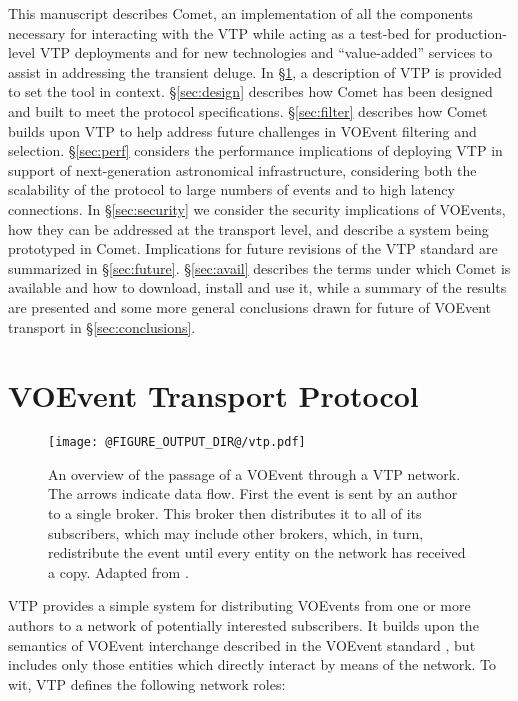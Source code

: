 \documentclass[5p,authoryear]{elsarticle}
\begin{document}
This manuscript describes Comet, an implementation of all the components
necessary for interacting with the VTP while acting as a test-bed for
production-level VTP deployments and for new technologies and ``value-added''
services to assist in addressing the transient deluge. In \S\ref{sec:vtp}, a
description of VTP is provided to set the tool in context.  \S\ref{sec:design}
describes how Comet has been designed and built to meet the protocol
specifications. \S\ref{sec:filter} describes how Comet builds upon VTP to help
address future challenges in VOEvent filtering and selection.
\S\ref{sec:perf} considers the performance implications of deploying VTP in
support of next-generation astronomical infrastructure, considering both the
scalability of the protocol to large numbers of events and to high latency
connections. In \S\ref{sec:security} we consider the security implications of
VOEvents, how they can be addressed at the transport level, and describe a
system being prototyped in Comet. Implications for future revisions of the VTP
standard are summarized in \S\ref{sec:future}.  \S\ref{sec:avail} describes
the terms under which Comet is available and how to download, install and use
it, while a summary of the results are presented and some more general
conclusions drawn for future of VOEvent transport in \S\ref{sec:conclusions}.

\section{VOEvent Transport Protocol}
\label{sec:vtp}

\begin{figure}
  \begin{center}
  \texttt{[image: @FIGURE\_OUTPUT\_DIR@/vtp.pdf]}
  \end{center}

  \caption{An overview of the passage of a VOEvent through a VTP network. The
  arrows indicate data flow. First the event is sent by an author to a single
  broker. This broker then distributes it to all of its subscribers, which may
  include other brokers, which, in turn, redistribute the event until every
  entity on the network has received a copy.  Adapted from
  \citet{Swinbank:2014}.}

  \label{fig:vtp}
\end{figure}

VTP provides a simple system for distributing VOEvents from one or more
authors to a network of potentially interested subscribers. It builds upon the
semantics of VOEvent interchange described in the VOEvent standard
\citep{Seaman:2011}, but includes only those entities which directly interact
by means of the network. To wit, VTP defines the following network roles:
\end{document}
